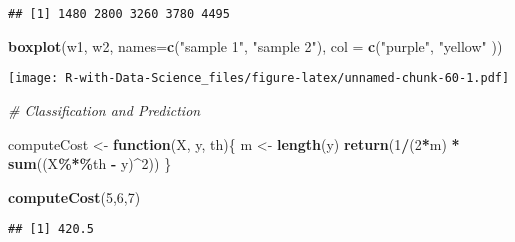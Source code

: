 \documentclass[
]{article}
\newenvironment{Shaded}{\begin{snugshade}}{\end{snugshade}}
\newcommand{\AttributeTok}[1]{\textcolor[rgb]{0.13,0.29,0.53}{#1}}
\newcommand{\CommentTok}[1]{\textcolor[rgb]{0.56,0.35,0.01}{\textit{#1}}}
\newcommand{\ControlFlowTok}[1]{\textcolor[rgb]{0.13,0.29,0.53}{\textbf{#1}}}
\newcommand{\DecValTok}[1]{\textcolor[rgb]{0.00,0.00,0.81}{#1}}
\newcommand{\FunctionTok}[1]{\textcolor[rgb]{0.13,0.29,0.53}{\textbf{#1}}}
\newcommand{\NormalTok}[1]{#1}
\newcommand{\OtherTok}[1]{\textcolor[rgb]{0.56,0.35,0.01}{#1}}
\newcommand{\SpecialCharTok}[1]{\textcolor[rgb]{0.81,0.36,0.00}{\textbf{#1}}}
\newcommand{\StringTok}[1]{\textcolor[rgb]{0.31,0.60,0.02}{#1}}
\begin{document}
\begin{verbatim}
## [1] 1480 2800 3260 3780 4495
\end{verbatim}

\begin{Shaded}
\begin{Highlighting}[]
\FunctionTok{boxplot}\NormalTok{(w1, w2, }\AttributeTok{names=}\FunctionTok{c}\NormalTok{(}\StringTok{"sample 1"}\NormalTok{, }\StringTok{"sample 2"}\NormalTok{), }\AttributeTok{col =} \FunctionTok{c}\NormalTok{(}\StringTok{"purple"}\NormalTok{, }\StringTok{"yellow"}\NormalTok{ ))}
\end{Highlighting}
\end{Shaded}

\texttt{[image: R-with-Data-Science\_files/figure-latex/unnamed-chunk-60-1.pdf]}

\begin{Shaded}
\begin{Highlighting}[]
\CommentTok{\# Classification and Prediction}

\NormalTok{computeCost }\OtherTok{\textless{}{-}} \ControlFlowTok{function}\NormalTok{(X, y, th)\{}
\NormalTok{m }\OtherTok{\textless{}{-}} \FunctionTok{length}\NormalTok{(y)}
\FunctionTok{return}\NormalTok{(}\DecValTok{1}\SpecialCharTok{/}\NormalTok{(}\DecValTok{2}\SpecialCharTok{*}\NormalTok{m) }\SpecialCharTok{*} \FunctionTok{sum}\NormalTok{((X}\SpecialCharTok{\%*\%}\NormalTok{th }\SpecialCharTok{{-}}\NormalTok{ y)}\SpecialCharTok{\^{}}\DecValTok{2}\NormalTok{))}
\NormalTok{\}}

\FunctionTok{computeCost}\NormalTok{(}\DecValTok{5}\NormalTok{,}\DecValTok{6}\NormalTok{,}\DecValTok{7}\NormalTok{)}
\end{Highlighting}
\end{Shaded}

\begin{verbatim}
## [1] 420.5
\end{verbatim}
\end{document}
